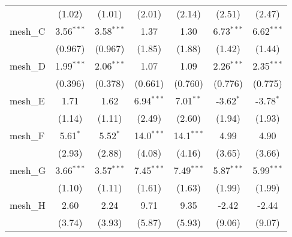 \begin{tabular}{lcccccc}
                                                               & (1.02)         & (1.01)         & (2.01)        & (2.14)        & (2.51)         & (2.47)\\   
   mesh\_C                                                     & 3.56$^{***}$   & 3.58$^{***}$   & 1.37          & 1.30          & 6.73$^{***}$   & 6.62$^{***}$\\   
                                                               & (0.967)        & (0.967)        & (1.85)        & (1.88)        & (1.42)         & (1.44)\\   
   mesh\_D                                                     & 1.99$^{***}$   & 2.06$^{***}$   & 1.07          & 1.09          & 2.26$^{***}$   & 2.35$^{***}$\\   
                                                               & (0.396)        & (0.378)        & (0.661)       & (0.760)       & (0.776)        & (0.775)\\   
   mesh\_E                                                     & 1.71           & 1.62           & 6.94$^{***}$  & 7.01$^{**}$   & -3.62$^{*}$    & -3.78$^{*}$\\   
                                                               & (1.14)         & (1.11)         & (2.49)        & (2.60)        & (1.94)         & (1.93)\\   
   mesh\_F                                                     & 5.61$^{*}$     & 5.52$^{*}$     & 14.0$^{***}$  & 14.1$^{***}$  & 4.99           & 4.90\\   
                                                               & (2.93)         & (2.88)         & (4.08)        & (4.16)        & (3.65)         & (3.66)\\   
   mesh\_G                                                     & 3.66$^{***}$   & 3.57$^{***}$   & 7.45$^{***}$  & 7.49$^{***}$  & 5.87$^{***}$   & 5.99$^{***}$\\   
                                                               & (1.10)         & (1.11)         & (1.61)        & (1.63)        & (1.99)         & (1.99)\\   
   mesh\_H                                                     & 2.60           & 2.24           & 9.71          & 9.35          & -2.42          & -2.44\\   
                                                               & (3.74)         & (3.93)         & (5.87)        & (5.93)        & (9.06)         & (9.07)\\   

\end{tabular}
